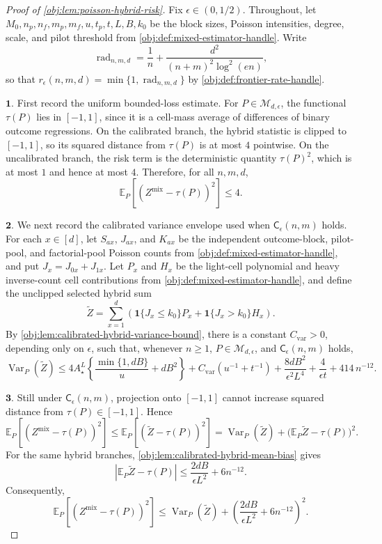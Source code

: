 \begin{proof}[Proof of \cref{obj:lem:poisson-hybrid-risk}]
Fix \(\epsilon\in(0,1/2)\).  Throughout, let \(M_0,n_p,n_f,m_p,m_f,u,t_p,t,L,B,k_0\) be the block sizes, Poisson intensities, degree, scale, and pilot threshold from \cref{obj:def:mixed-estimator-handle}.  Write
\[
\operatorname{rad}_{n,m,d}
=
\frac1n+\frac{d^2}{(n+m)^2\log^2(en)} ,
\]
so that \(r_\epsilon(n,m,d)=\min\{1,\operatorname{rad}_{n,m,d}\}\) by \cref{obj:def:frontier-rate-handle}.

\(\mathbf{1.}\) First record the uniform bounded-loss estimate.  For \(P\in\mathcal M_{d,\epsilon}\), the functional \(\tau(P)\) lies in \([-1,1]\), since it is a cell-mass average of differences of binary outcome regressions.  On the calibrated branch, the hybrid statistic is clipped to \([-1,1]\), so its squared distance from \(\tau(P)\) is at most \(4\) pointwise.  On the uncalibrated branch, the risk term is the deterministic quantity \(\tau(P)^2\), which is at most \(1\) and hence at most \(4\).  Therefore, for all \(n,m,d\),
\[
\mathbb E_P\!\left[(Z^{\mathrm{mix}}-\tau(P))^2\right]\le 4 .
\]

\(\mathbf{2.}\) We next record the calibrated variance envelope used when \(\mathsf C_\epsilon(n,m)\) holds.  For each \(x\in[d]\), let \(S_{ax}\), \(J_{ax}\), and \(K_{ax}\) be the independent outcome-block, pilot-pool, and factorial-pool Poisson counts from \cref{obj:def:mixed-estimator-handle}, and put \(J_x=J_{0x}+J_{1x}\).  Let \(P_x\) and \(H_x\) be the light-cell polynomial and heavy inverse-count cell contributions from \cref{obj:def:mixed-estimator-handle}, and define the unclipped selected hybrid sum
\[
\widetilde Z
=
\sum_{x=1}^d
\left(
\mathbf 1\{J_x\le k_0\}P_x
+
\mathbf 1\{J_x>k_0\}H_x
\right).
\]
By \cref{obj:lem:calibrated-hybrid-variance-bound}, there is a constant \(C_{\mathrm{var}}>0\), depending only on \(\epsilon\), such that, whenever \(n\ge1\), \(P\in\mathcal M_{d,\epsilon}\), and \(\mathsf C_\epsilon(n,m)\) holds,
\[
\operatorname{Var}_P(\widetilde Z)
\le
4A_\star^L
\left\{
\frac{\min\{1,dB\}}u+dB^2
\right\}
+
C_{\mathrm{var}}\left(u^{-1}+t^{-1}\right)
+
\frac{8dB^2}{\epsilon^2L^4}
+
\frac4{\epsilon t}
+
414\,n^{-12}.
\]

\(\mathbf{3.}\) Still under \(\mathsf C_\epsilon(n,m)\), projection onto \([-1,1]\) cannot increase squared distance from \(\tau(P)\in[-1,1]\).  Hence
\[
\mathbb E_P\!\left[(Z^{\mathrm{mix}}-\tau(P))^2\right]
\le
\mathbb E_P\!\left[(\widetilde Z-\tau(P))^2\right]
=
\operatorname{Var}_P(\widetilde Z)
+
\bigl(\mathbb E_P\widetilde Z-\tau(P)\bigr)^2 .
\]
For the same hybrid branches, \cref{obj:lem:calibrated-hybrid-mean-bias} gives
\[
\left|\mathbb E_P\widetilde Z-\tau(P)\right|
\le
\frac{2dB}{\epsilon L^2}+6n^{-12}.
\]
Consequently,
\[
\mathbb E_P\!\left[(Z^{\mathrm{mix}}-\tau(P))^2\right]
\le
\operatorname{Var}_P(\widetilde Z)
+
\left(
\frac{2dB}{\epsilon L^2}+6n^{-12}
\right)^2 .
\]


\end{proof}
